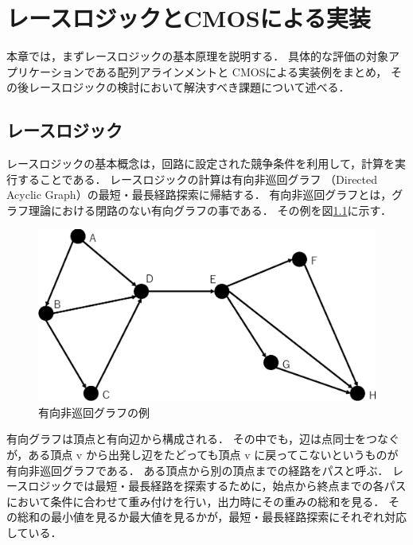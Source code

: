 \chapter{レースロジックとCMOSによる実装}
本章では，まずレースロジックの基本原理を説明する．
具体的な評価の対象アプリケーションである配列アラインメントと
CMOSによる実装例をまとめ，
その後レースロジックの検討において解決すべき課題について述べる．

\section{レースロジック}
レースロジックの基本概念は，回路に設定された競争条件を利用して，計算を実行することである．
レースロジックの計算は有向非巡回グラフ
（Directed Acyclic Graph）の最短・最長経路探索に帰結する．
有向非巡回グラフとは，グラフ理論における閉路のない有向グラフの事である．
その例を図\ref{fig:DAG}に示す．
\begin{figure}[t!]
\begin{center}
\includegraphics[keepaspectratio,scale=0.5]{fig/2/DAG.eps}
\caption{有向非巡回グラフの例}
\label{fig:DAG}
\end{center}
\end{figure}
有向グラフは頂点と有向辺から構成される．
その中でも，辺は点同士をつなぐが，ある頂点 v から出発し辺をたどっても頂点 v に戻ってこないというものが
有向非巡回グラフである．
ある頂点から別の頂点までの経路をパスと呼ぶ．
レースロジックでは最短・最長経路を探索するために，始点から終点までの各パスにおいて条件に合わせて重み付けを行い，出力時にその重みの総和を見る．
その総和の最小値を見るか最大値を見るかが，最短・最長経路探索にそれぞれ対応している．


